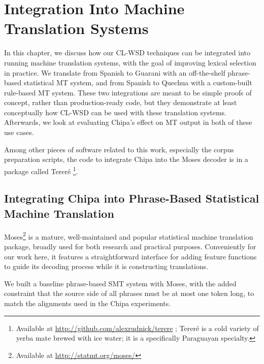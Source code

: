 \chapter{Integration Into Machine Translation Systems}
\label{chap:integration}

In this chapter, we discuss how our CL-WSD techniques can be integrated into
running machine translation systems, with the goal of improving lexical
selection in practice. We translate from Spanish to Guarani with an
off-the-shelf phrase-based statistical MT system, and from Spanish to Quechua
with a custom-built rule-based MT system. These two integrations are meant to
be simple proofs of concept, rather than production-ready code, but they
demonstrate at least conceptually how CL-WSD can be used with these translation
systems.
Afterwards, we look at evaluating Chipa's effect on MT output in both of these
use cases.

Among other pieces of software related to this work, especially the corpus
preparation scripts, the code to integrate Chipa into the Moses decoder is in a
package called Tereré \footnote{Available at
\url{http://github.com/alexrudnick/terere} ; Tereré is a cold variety of yerba
mate brewed with ice water; it is a specifically Paraguayan specialty.}.


\section{Integrating Chipa into Phrase-Based Statistical Machine Translation}
\label{sec:terere}

Moses\footnote{Available at
\url{http://statmt.org/moses/}}\cite{koehn-EtAl:2007:PosterDemo} is a mature,
well-maintained and popular statistical machine translation package, broadly
used for both research and practical purposes. Conveniently for our work here,
it features a straightforward interface for adding feature functions to guide
its decoding process while it is constructing translations.

We built a baseline phrase-based SMT system with Moses, with the added
constraint that the source side of all phrases must be at most one token long,
to match the alignments used in the Chipa experiments.

